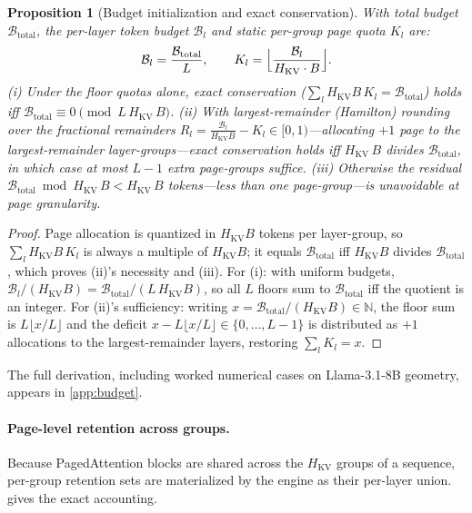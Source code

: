 \documentclass[final,5p,times,twocolumn]{elsarticle}
\newtheorem{proposition}{Proposition}
\theoremstyle{definition}
\theoremstyle{remark}
\newcommand{\HKV}{H_{\mathrm{KV}}}
\begin{document}
\begin{proposition}[Budget initialization and exact conservation]
\label{prop:budget_conservation}
With total budget $\mathcal{B}_{\mathrm{total}}$, the per-layer token
budget $\mathcal{B}_l$ and static per-group page quota $K_l$ are:
\begin{equation}
\mathcal{B}_l = \frac{\mathcal{B}_{\mathrm{total}}}{L},
\qquad
K_l = \Bigl\lfloor \frac{\mathcal{B}_l}{\HKV \cdot B} \Bigr\rfloor.
\label{eq:page_quotas}
\end{equation}
\textup{(i)} Under the floor quotas alone, exact conservation
($\sum_l \HKV B\,K_l = \mathcal{B}_{\mathrm{total}}$) holds iff
 $\mathcal{B}_{\mathrm{total}} \equiv 0 \pmod{L\,\HKV\,B}$.
\textup{(ii)} With largest-remainder (Hamilton) rounding over the
fractional remainders
 $R_l = \frac{\mathcal{B}_l}{\HKV B} - K_l \in [0,1)$---allocating $+1$ page to the largest-remainder layer-groups---exact conservation holds
iff $\HKV\,B$ divides $\mathcal{B}_{\mathrm{total}}$, in which case at
most $L-1$ extra page-groups suffice.
\textup{(iii)} Otherwise the residual
 $\mathcal{B}_{\mathrm{total}} \bmod \HKV\,B < \HKV\,B$ tokens---less
than one page-group---is unavoidable at page granularity.
\end{proposition}

\begin{proof}
Page allocation is quantized in $\HKV B$ tokens per layer-group, so
 $\sum_l \HKV B\,K_l$ is always a multiple of $\HKV B$; it equals
 $\mathcal{B}_{\mathrm{total}}$ iff $\HKV B$ divides
 $\mathcal{B}_{\mathrm{total}}$, which proves (ii)'s necessity and
(iii). For (i): with uniform budgets,
 $\mathcal{B}_l/(\HKV B) = \mathcal{B}_{\mathrm{total}}/(L\,\HKV B)$, so
all $L$ floors sum to $\mathcal{B}_{\mathrm{total}}$ iff the quotient is
an integer. For (ii)'s sufficiency: writing
 $x = \mathcal{B}_{\mathrm{total}}/(\HKV B) \in \mathbb{N}$, the floor
sum is $L\lfloor x/L\rfloor$ and the deficit $x - L\lfloor x/L\rfloor
\in \{0,\dots,L-1\}$ is distributed as $+1$ allocations to the
largest-remainder layers, restoring $\sum_l K_l = x$.
\end{proof}

The full derivation, including worked numerical cases on Llama-3.1-8B
geometry, appears in \cref{app:budget}.

\paragraph{Page-level retention across groups.}
Because PagedAttention blocks are shared across the $\HKV$ groups of a
sequence, per-group retention sets are materialized by the engine as
their per-layer union.  gives the
exact accounting.
\end{document}

